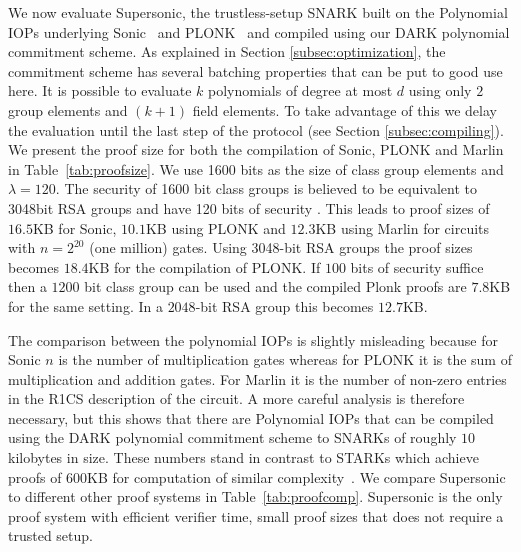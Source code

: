 We now evaluate \textsf{Supersonic}, the trustless-setup SNARK built on the Polynomial IOPs underlying \textsf{Sonic}~\cite{Sonic} and \textsf{PLONK}~\cite{Plonk} and compiled using our DARK polynomial commitment scheme. As explained in Section \ref{subsec:optimization}, the commitment scheme has several batching properties that can be put to good use here. It is possible to evaluate $k$ polynomials of degree at most $d$ using only $2$ group elements and $(k+1)$ field elements. To take advantage of this we delay the evaluation until the last step of the protocol (see Section \ref{subsec:compiling}). We present the proof size for both the compilation of \textsf{Sonic}, \textsf{PLONK} and \textsf{Marlin} in Table~\ref{tab:proofsize}. We use 1600 bits as the size of class group elements and $\lambda=120$. The security of 1600 bit class groups is believed to be equivalent to 3048bit RSA groups and have 120 bits of security \cite{PKC/BucHam01,DBLP:journals/corr/BiasseJS10}. This leads to proof sizes of $16.5$KB for \textsf{Sonic}, $10.1$KB using \textsf{PLONK} and $12.3$KB using \textsf{Marlin} for circuits with $n = 2^{20}$ (one million) gates. Using 3048-bit RSA groups the proof sizes becomes $18.4$KB for the compilation of  \textsf{PLONK}. If $100$ bits of security suffice then a $1200$ bit class group can be used and the compiled Plonk proofs are $7.8$KB for the same setting. In a $2048$-bit RSA group this becomes $12.7$KB.

The comparison between the polynomial IOPs is slightly misleading because for \textsf{Sonic} $n$ is the number of multiplication gates whereas for \textsf{PLONK} it is the sum of multiplication and addition gates. For \textsf{Marlin} it is the number of non-zero entries in the R1CS description of the circuit. A more careful analysis is therefore necessary, but this shows that there are Polynomial IOPs that can be compiled using the DARK polynomial commitment scheme to SNARKs of roughly $10$ kilobytes in size. These numbers stand in contrast to \textsf{STARK}s which achieve proofs of $600$KB for computation of similar complexity~\cite{C:BBHR19}. We compare \textsf{Supersonic} to different other proof systems in Table~\ref{tab:proofcomp}. \textsf{Supersonic} is the only proof system with efficient verifier time, small proof sizes that does not require a trusted setup.

